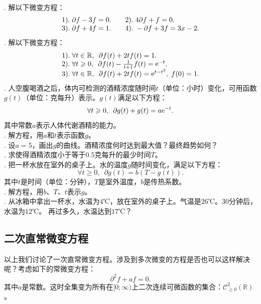 \documentclass[12pt,UTF8]{ctexbook}
\begin{document}
\begin{xt}
    \mbox{} \\
    . 解以下微变方程：\\
    $$
    \begin{array}[]{ll}
        1).\;\partial f - 3 f = 0. &\quad2).\; 4\partial f + f = 0. \\
        3).\;\partial f + 4 f = 1. &\quad4).\; -\partial f + 3 f = 3x - 2. 
    \end{array}
    $$
    . 解以下微变方程：\\
    $$
    \begin{array}[]{l}
        1).\;\forall t\in \mathbb{R},\,\,\,\partial f(t) + 2 t f(t) = 1. \\
        2).\;\forall t \geqslant 0,\,\,\,\partial f(t) - \frac{1}{t + 1} f(t) = \e^{-t}. \\
        3).\;\forall t\in \mathbb{R},\,\,\,\partial f(t) + 2t f(t) =\e^{t - t^2}, \; f(0) = 1. 
    \end{array}
    $$
    . 人空腹喝酒之后，体内可检测的酒精浓度随时间$t$（单位：小时）变化，可用函数$g(t)$（单位：克每升）表示。$g(t)$满足以下方程：
    $$ \forall t\geqslant 0,\,\,\,\partial g(t) + g(t) = a \mathrm{e}^{-t}.$$
    其中常数$a$表示人体代谢酒精的能力。\\
    . 解方程，用$a$和$t$表示函数$g$。\\
    . 设$a = 5$，画出$g$的曲线。酒精浓度何时达到最大值？最终趋势如何？\\
    . 求使得酒精浓度小于等于$0.5$克每升的最少时间$T$。\\
    . 把一杯水放在室外的桌子上。水的温度$g$随时间变化，满足以下方程：
    $$ \forall t\geqslant 0,\,\,\,\partial g(t) = b(T - g(t)).$$
    其中$t$是时间（单位：分钟），$T$是室外温度，$b$是传热系数。\\
    . 解方程，用$b$、$T$、$t$表示$g$。\\
    . 从冰箱中拿出一杯水，水温为$4$℃，放在室外的桌子上。气温是$26$℃。$30$分钟后，水温为$12$℃。
    再过多久，水温达到$17$℃？
\end{xt}

\subsection{二次直常微变方程}
以上我们讨论了一次直常微变方程。涉及到多次微变的方程是否也可以这样解决呢？考虑如下的常微变方程：
\begin{equation}
    \partial^2 f + a f = 0. \label{2-2d}
\end{equation}
其中$a$是常数。这时全集变为所有在$[0;\infty)$上二次连续可微函数的集合：$\mathcal{C}^2_{\geqslant 0}(\mathbb{R})$。
\end{document}
